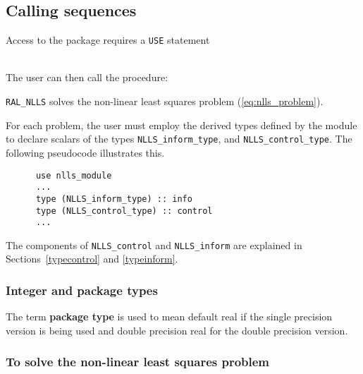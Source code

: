 \documentclass{spec}
\begin{document}
\newpage
\hslhowto

\subsection{Calling sequences}

Access to the package requires a {\tt USE} statement \\ \\
\indent\hspace{5mm}{\tt use nlls\_module} 
\medskip

\noindent The user can then call the procedure:
\vspace{-0.1cm}
\begin{description}
\item {\tt RAL\_NLLS}  solves the non-linear least squares problem (\ref{eq:nlls_problem}).
\end{description}


\hsltypes
\label{derived types}
For each problem, the user must employ the derived types defined by the
module to declare scalars of the types {\tt NLLS\_inform\_type}, and
{\tt NLLS\_control\_type}.
The following pseudocode illustrates this.
\begin{verbatim}
      use nlls_module
      ...
      type (NLLS_inform_type) :: info
      type (NLLS_control_type) :: control
      ...
\end{verbatim}
The components of {\tt NLLS\_control} and {\tt NLLS\_inform} are explained
in Sections~\ref{typecontrol} and \ref{typeinform}. 


\hslarguments

\subsubsection{Integer and package types}
The term {\bf package type} is used to mean
default real if the single precision version is being used and
double precision real for the double precision version.

\subsubsection{To solve the non-linear least squares problem}
\label{sec:factorize}
\end{document}
